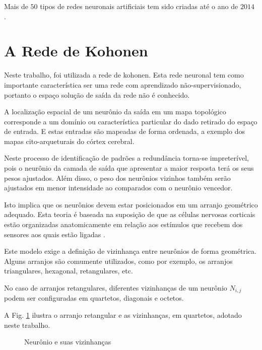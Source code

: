 Mais de $50$ tipos de redes neuronais artificiais tem sido criadas até o ano de $2014$ \citep{Saljooghi2014}.


\section{A Rede de Kohonen}

Neste trabalho, foi utilizada a rede de kohonen. Esta rede neuronal tem como importante característica ser uma rede com aprendizado não-supervisionado, portanto o espaço solução de saída da rede não é conhecido. 

A localização espacial de um neurônio da saída em um mapa topológico
corresponde a um domínio ou característica particular do dado retirado do espaço de entrada. E estas entradas são mapeadas de forma ordenada, a exemplo dos mapas cito-arqueturais do córtex cerebral.

Neste processo de identificação de padrões a redundância torna-se impreterível,
pois o neurônio da camada de saída que apresentar a maior resposta terá os seus
pesos ajustados. Além disso, o peso dos neurônios vizinhos também serão
ajustados em menor intensidade ao comparados com o neurônio vencedor.

Isto implica que os neurônios devem estar posicionados em um arranjo geométrico
adequado. Esta teoria é baseada na suposição de que as células nervosas
corticais estão organizadas anatomicamente em relação aos estímulos que recebem
dos sensores aos quais estão ligadas \citep{Artero2009}.

Este modelo exige a definição de vizinhança entre neurônios de forma geométrica. Alguns arranjos são comumente utilizados, como por exemplo, os arranjos triangulares, hexagonal, retangulares, etc.

No caso de arranjos retangulares, diferentes vizinhanças de um neurônio
$N_{i,j}$ podem ser configuradas em quartetos, diagonais e octetos. 

A Fig. \ref{hiperplano} ilustra o arranjo retangular e as vizinhanças, em quartetos, adotado neste trabalho. 

\begin{figure}[H]
	\centering
	\setlength{\fboxsep}{8pt}
	\setlength{\fboxrule}{0.1pt}
	\caption{Neurônio e suas vizinhanças}
	\label{hiperplano}
\end{figure}

